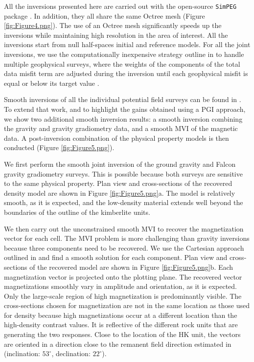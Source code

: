 \documentclass[paper, twocolumn]{geophysics} %
\begin{document}
All the inversions presented here are carried out with the open-source \texttt{SimPEG} package \citep{Cockett2015}. In addition, they all share the same Octree mesh (Figure \ref{fig:Figure4.png}). The use of an Octree mesh significantly speeds up the inversions while maintaining high resolution in the area of interest. All the inversions start from null half-spaces initial and reference models. For all the joint inversions, we use the computationally inexpensive strategy outline in \citet{AsticJoint} to handle multiple geophysical surveys, where the weights of the components of the total data misfit term are adjusted during the inversion until each geophysical misfit is equal or below its target value \citep{Parker}.

Smooth inversions of all the individual potential field surveys can be found in \citet{TKCpaper}. To extend that work, and to highlight the gains obtained using a PGI approach, we show two additional smooth inversion results: a smooth inversion combining the gravity and gravity gradiometry data, and a smooth MVI of the magnetic data. A post-inversion combination of the physical property models is then conducted (Figure \ref{fig:Figure5.png}).

We first perform the smooth joint inversion of the ground gravity and Falcon gravity gradiometry surveys. This is possible because both surveys are sensitive to the same physical property. Plan view and cross-sections of the recovered density model are shown in Figure \ref{fig:Figure5.png}a. The model is relatively smooth, as it is expected, and the low-density material extends well beyond the boundaries of the outline of the kimberlite units.

We then carry out the unconstrained smooth MVI to recover the magnetization vector for each cell. The MVI problem is more challenging than gravity inversions because three components need to be recovered. We use the Cartesian approach outlined in \citet{MVI} and find a smooth solution for each component. Plan view and cross-sections of the recovered model are shown in Figure \ref{fig:Figure5.png}b. Each magnetization vector is projected onto the plotting plane. The recovered vector magnetizations smoothly vary in amplitude and orientation, as it is expected. Only the large-scale region of high magnetization is predominantly visible. The cross-sections chosen for magnetization are not in the same location as those used for density because high magnetizations occur at a different location than the high-density contrast values. It is reflective of the different rock units that are generating the two responses. Close to the location of the HK unit, the vectors are oriented in a direction close to the remanent field direction estimated in \citet{TKCpaper} (inclination: $53^{\circ}$, declination: $22^{\circ}$).
\end{document}
